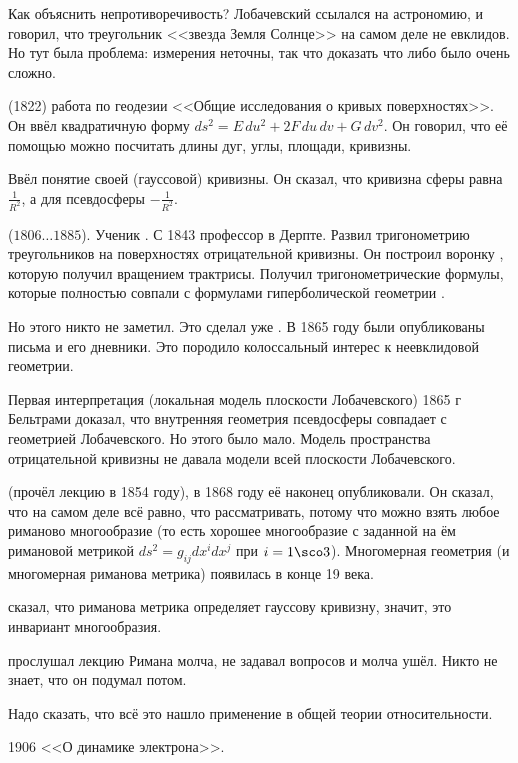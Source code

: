 \documentclass[a4paper,oneside,fleqn,10pt]{article}
\newcommand{\pe}[2]{${#1}\ldots{#2}$}
\begin{document}
Как объяснить непротиворечивость? Лобачевский ссылался на астрономию,
и говорил, что треугольник <<звезда Земля Солнце>> на самом деле не
евклидов. Но тут была проблема: измерения неточны, так что доказать
что либо было очень сложно.

 (1822) работа по геодезии <<Общие исследования о кривых
поверхностях>>.  Он ввёл квадратичную форму $ds^2 = E\,du^2 +
2F\,du\,dv + G\, dv^2$.  Он говорил, что её помощью можно посчитать
длины дуг, углы, площади, кривизны.

Ввёл понятие своей (гауссовой) кривизны. Он сказал, что кривизна сферы
равна $\frac{1}{R^2}$, а для псевдосферы $-\frac{1}{R^2}$.

 (\pe{1806}{1885}). Ученик .  С
1843 профессор в Дерпте. Развил тригонометрию треугольников на
поверхностях отрицательной кривизны. Он построил воронку
, которую получил вращением трактрисы.  Получил
тригонометрические формулы, которые полностью совпали с формулами
гиперболической геометрии .

Но этого никто не заметил. Это сделал уже .  В 1865
году были опубликованы письма  и его дневники.
Это породило колоссальный интерес к неевклидовой геометрии.

Первая интерпретация (локальная модель плоскости Лобачевского) 1865 г
Бельтрами доказал, что внутренняя геометрия псевдосферы совпадает с
геометрией Лобачевского.  Но этого было мало. Модель пространства
отрицательной кривизны не давала модели всей плоскости Лобачевского.

 (прочёл лекцию в 1854 году), в 1868 году её наконец
опубликовали.  Он сказал, что на самом деле всё равно, что
рассматривать, потому что можно взять любое риманово многообразие (то
есть хорошее многообразие с заданной на ём римановой метрикой $ds^2 =
g_{ij}dx^idx^j$ при $i = 1\sco 3$).  Многомерная геометрия (и
многомерная риманова метрика) появилась в конце 19 века.

 сказал, что риманова метрика определяет гауссову
кривизну, значит, это инвариант многообразия.

 прослушал лекцию Римана молча, не задавал вопросов и
молча ушёл.  Никто не знает, что он подумал потом.

Надо сказать, что всё это нашло применение в общей теории
относительности.

1906  <<О динамике электрона>>.
\end{document}
